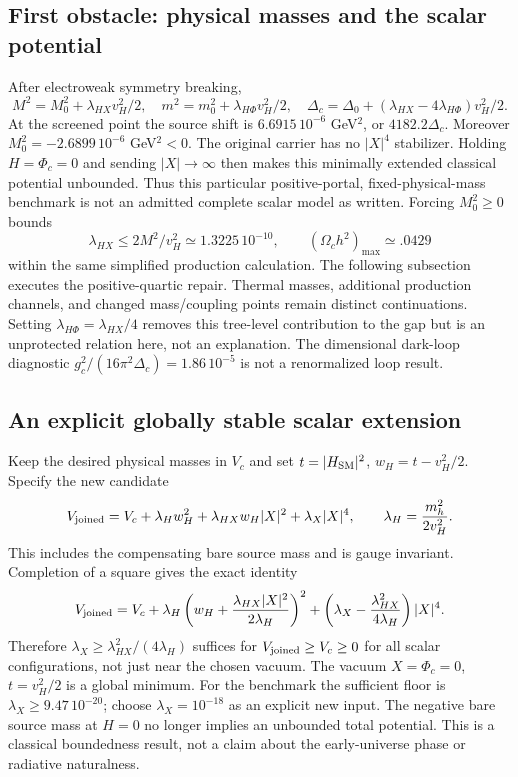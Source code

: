 \documentclass[11pt]{article}
\begin{document}
\subsection{First obstacle: physical masses and the scalar potential}
After electroweak symmetry breaking,
\begin{equation}
 M^2=M_0^2+\lambda_{HX}v_H^2/2,\quad
 m^2=m_0^2+\lambda_{H\Phi}v_H^2/2,\quad
 \Delta_c=\Delta_0+(\lambda_{HX}-4\lambda_{H\Phi})v_H^2/2.
\end{equation}
At the screened point the source shift is $6.6915\,10^{-6}$ GeV$^2$,
or $4182.2\Delta_c$. Moreover $M_0^2=-2.6899\,10^{-6}$ GeV$^2<0$.
The original carrier has no $|X|^4$ stabilizer. Holding $H=\Phi_c=0$ and
sending $|X|\to\infty$ then makes this minimally extended classical
potential unbounded. Thus this particular positive-portal, fixed-physical-mass
benchmark is not an admitted complete scalar model as written.
Forcing $M_0^2\ge0$ bounds
\begin{equation}
 \lambda_{HX}\le2M^2/v_H^2\simeq1.3225\,10^{-10},\qquad
 (\Omega_c h^2)_{\max}\simeq.0429
\end{equation}
within the same simplified production calculation.
The following subsection executes the positive-quartic repair. Thermal
masses, additional production channels, and changed mass/coupling points
remain distinct continuations. Setting $\lambda_{H\Phi}=\lambda_{HX}/4$
removes this tree-level contribution to the gap but is an unprotected
relation here, not an explanation. The dimensional dark-loop diagnostic
$g_c^2/(16\pi^2\Delta_c)=1.86\,10^{-5}$ is not a renormalized loop result.

\subsection{An explicit globally stable scalar extension}
Keep the desired physical masses in $V_c$ and set
$t=|H_{\rm SM}|^2$, $w_H=t-v_H^2/2$. Specify the new candidate
\begin{equation}
 V_{\rm joined}=V_c+\lambda_H w_H^2
 +\lambda_{HX}w_H|X|^2+\lambda_X|X|^4,
 \qquad \lambda_H=\frac{m_h^2}{2v_H^2}.
\end{equation}
This includes the compensating bare source mass and is gauge invariant.
Completion of a square gives the exact identity
\begin{equation}
 V_{\rm joined}=V_c+
 \lambda_H\left(w_H+\frac{\lambda_{HX}|X|^2}{2\lambda_H}\right)^2
 +\left(\lambda_X-\frac{\lambda_{HX}^2}{4\lambda_H}\right)|X|^4.
\end{equation}
Therefore $\lambda_X\ge\lambda_{HX}^2/(4\lambda_H)$ suffices for
$V_{\rm joined}\ge V_c\ge0$ for all scalar configurations, not just
near the chosen vacuum. The vacuum $X=\Phi_c=0$, $t=v_H^2/2$ is a global
minimum. For the benchmark the sufficient floor is
$\lambda_X\ge9.47\,10^{-20}$; choose $\lambda_X=10^{-18}$ as an explicit
new input. The negative bare source mass at $H=0$ no longer implies an
unbounded total potential. This is a classical boundedness result, not
a claim about the early-universe phase or radiative naturalness.
\end{document}
